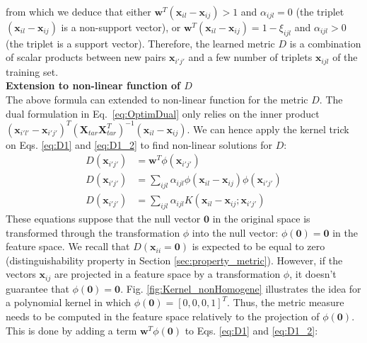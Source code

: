 \noindent from which we deduce that either $\textbf{w}^T(\textbf{x}_{il}-\textbf{x}_{ij}) > 1 $ and $\alpha_{ijl} = 0$ (the triplet $(\textbf{x}_{il}-\textbf{x}_{ij})$ is a non-support vector), or $\textbf{w}^T(\textbf{x}_{il}-\textbf{x}_{ij}) = 1- \xi_{ijl}$ and $\alpha_{ijl} > 0$ (the triplet is a support vector). Therefore, the learned metric $D$ is a combination of scalar products between new pairs $\textbf{x}_{i'j'}$ and a few number of triplets $\textbf{x}_{ijl}$ of the training set. \\


\noindent \textbf{Extension to non-linear function of $D$} \\
\noindent The above formula can extended to non-linear function for the metric $D$. The dual formulation in Eq.~\ref{eq:OptimDual} only relies on the inner product $(\textbf{x}_{i'l'}-\textbf{x}_{i'j'})^T (\textbf{X}_{tar} \textbf{X}_{tar}^T)^{-1} (\textbf{x}_{il}-\textbf{x}_{ij})$. We can hence apply the kernel trick on Eqs. \ref{eq:D1} and \ref{eq:D1_2} to find non-linear solutions for $D$:
\begin{align}
	D(\textbf{x}_{i'j'}) & = \textbf{w}^T \phi(\textbf{x}_{i'j'}) \nonumber\\
	D(\textbf{x}_{i'j'}) &= \sum\limits_{ijl} \alpha_{ijl} 
	\phi(
	\textbf{x}_{il}-\textbf{x}_{ij}
	)
	\phi(	
	\textbf{x}_{i'j'}
	) \nonumber \\
	D(\textbf{x}_{i'j'}) &= \sum\limits_{ijl} \alpha_{ijl} 
	K(\textbf{x}_{il}-\textbf{x}_{ij} ; \textbf{x}_{i'j'}) \nonumber				
\end{align}
These equations suppose that the null vector $\textbf{0}$ in the original space is transformed through the transformation $\phi$ into the null vector: $\phi(\textbf{0})=\textbf{0}$ in the feature space. We recall that $D(\textbf{x}_{ii} = \textbf{0})$ is expected to be equal to zero (distinguishability property in Section \ref{sec:property_metric}). However, if the vectors $\textbf{x}_{ij}$ are projected in a feature space by a transformation $\phi$, it doesn't guarantee that $\phi(\textbf{0})=\textbf{0}$. Fig. \ref{fig:Kernel_nonHomogene} illustrates the idea for a polynomial kernel in which $\phi(\textbf{0}) = [0, 0, 0, 1]^T$. Thus, the metric measure needs to be computed in the feature space relatively to the projection of $\phi(\textbf{0})$. This is done by adding a term $\textbf{w}^T \phi(\textbf{0})$ to Eqs. \ref{eq:D1} and \ref{eq:D1_2}:

